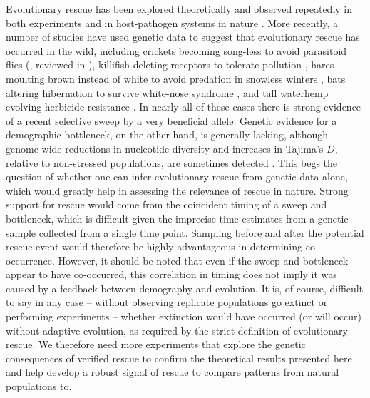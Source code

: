 \documentclass[]{article}
\begin{document}
Evolutionary rescue has been explored theoretically \citep[e.g.,][]{gomulkiewicz1995does,uecker2016role,anciaux2018evolutionary} and observed repeatedly in both experiments \citep[e.g.,][]{bell2009evolutionary,lindsey2013evolutionary,ramsayer2013evolutionary} and in host-pathogen systems in nature \citep[e.,g.,][]{wei1995viral,feder2016more}.
More recently, a number of studies have used genetic data to suggest that evolutionary rescue has occurred in the wild, including crickets becoming song-less to avoid parasitoid flies (\citealp{pascoal2018silent}, reviewed in \citealp{mcdermott2019news}), killifish deleting receptors to tolerate pollution \citep{oziolor2019adaptive}, hares moulting brown instead of white to avoid predation in snowless winters \citep{jones2018adaptive}, bats altering hibernation to survive white-nose syndrome \citep{gignoux2018genomic}, and tall waterhemp evolving herbicide resistance \citep{kreiner2019multiple}.
In nearly all of these cases there is strong evidence of a recent selective sweep by a very beneficial allele.
Genetic evidence for a demographic bottleneck, on the other hand, is generally lacking, although genome-wide reductions in nucleotide diversity and increases in Tajima's $D$, relative to non-stressed populations, are sometimes detected \citep{oziolor2019adaptive}.
This begs the question of whether one can infer evolutionary rescue from genetic data alone, which would greatly help in assessing the relevance of rescue in nature.
Strong support for rescue would come from the coincident timing of a sweep and bottleneck, which is difficult given the imprecise time estimates from a genetic sample collected from a single time point.  
Sampling before and after the potential rescue event would therefore be highly advantageous in determining co-occurrence.
However, it should be noted that even if the sweep and bottleneck appear to have co-occurred, this correlation in timing does not imply it was caused by a feedback between demography and evolution. 
It is, of course, difficult to say in any case -- without observing replicate populations go extinct or performing experiments -- whether extinction would have occurred (or will occur) without adaptive evolution, as required by the strict definition of evolutionary rescue.
We therefore need more experiments \citep[such as][]{rego2019dynamics} that explore the genetic consequences of verified rescue to confirm the theoretical results presented here and help develop a robust signal of rescue to compare patterns from natural populations to.
\end{document}
